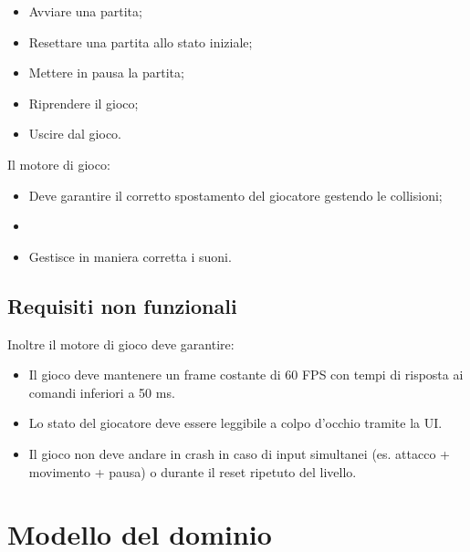 \documentclass[a4paper, italian, 11pt, oneside]{report}
\begin{document}
\begin{itemize}
  \begin{itemize}
    \item Avviare una partita;
    \item Resettare una partita allo stato iniziale;
    \item Mettere in pausa la partita;
    \item Riprendere il gioco;
    \item Uscire dal gioco.
  \end{itemize}
  Il motore di gioco:
  \begin{itemize}
    \item Deve garantire il corretto spostamento del giocatore gestendo le collisioni;
    \item 
    \item Gestisce in maniera corretta i suoni.
  \end{itemize}
\end{itemize}

\subsection{Requisiti non funzionali}
Inoltre il motore di gioco deve garantire:
\begin{itemize}
  \item Il gioco deve mantenere un frame costante di 60 FPS con tempi di risposta ai comandi inferiori a 50 ms.
  \item Lo stato del giocatore deve essere leggibile a colpo d'occhio tramite la UI.
  \item Il gioco non deve andare in crash in caso di input simultanei (es. attacco + movimento + pausa) o durante il reset ripetuto del livello.
\end{itemize}


\section{Modello del dominio}

\end{document}
